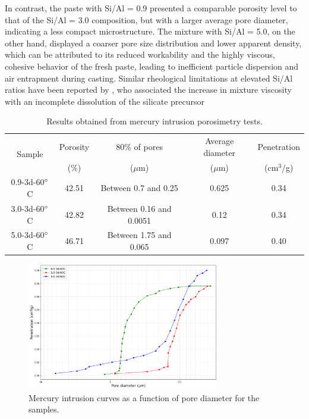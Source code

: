 In contrast, the paste with Si/Al = 0.9 presented a comparable porosity level to that of the Si/Al = 3.0 composition, but with a larger average pore diameter, indicating a less compact microstructure.
The mixture with Si/Al = 5.0, on the other hand, displayed a coarser pore size distribution and lower apparent density, which can be attributed to its reduced workability and the highly viscous, cohesive behavior of the fresh paste, leading to inefficient particle dispersion and air entrapment during casting.
 Similar rheological limitations at elevated Si/Al ratios have been reported by \cite{Geraldo2020}, who associated the increase in mixture viscosity with an incomplete dissolution of the silicate precursor

\begin{table}[H]
  \centering
  \caption{Results obtained from mercury intrusion porosimetry tests. \label{tab:mip}}
  \begin{tabular}{c c c c c}
    \hline
    \multirow{2}{*}{Sample} & Porosity & 80\% of pores  & Average diameter & Penetration  \\ 
    & (\%) & ($\mu$m) & ($\mu$m) & (cm$^3$/g) \\
    \hline
    0.9-3d-60$^{\circ}$C & 42.51 & Between 0.7 and 0.25 & 0.625 & 0.34 \\
    3.0-3d-60$^{\circ}$C & 42.82 & Between 0.16 and 0.0051 & 0.12 & 0.34 \\
    5.0-3d-60$^{\circ}$C & 46.71 & Between 1.75 and 0.065 & 0.097 & 0.40 \\
    \hline
  \end{tabular}
\end{table}

\begin{figure}[H]
  \centering
  \includegraphics[width=0.75\textwidth]{Cap4/images/mip_inverted.png}
  \caption{Mercury intrusion curves as a function of pore diameter for the samples.}
  \label{fig:mip}
\end{figure}

